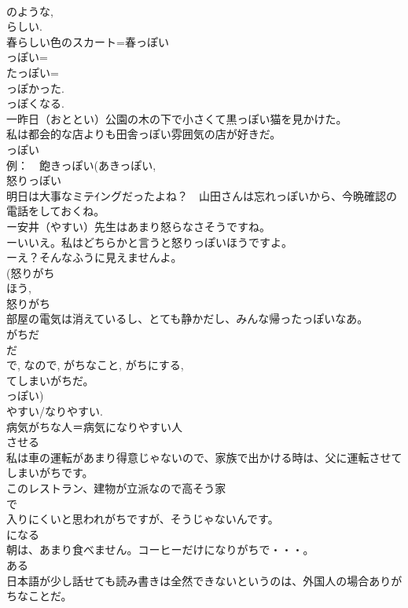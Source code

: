 \documentclass[8pt]{extreport}
\begin{document}
\begin{CJK}{UTF8}{min}
\\	のような, 
\\	らしい. 
\\	春らしい色のスカート=春っぽい
\\	っぽい= 
\\	たっぽい= 
\\	っぽかった.
\\	っぽくなる. 
\\	一昨日（おととい）公園の木の下で小さくて黒っぽい猫を見かけた。
\\	私は都会的な店よりも田舎っぽい雰囲気の店が好きだ。
\\	っぽい
\\	例：　飽きっぽい(あきっぽい, 
\\	怒りっぽい 
\\	明日は大事なミテｲングだったよね？　山田さんは忘れっぽいから、今晩確認の電話をしておくね。
\\	ー安井（やすい）先生はあまり怒らなさそうですね。
\\	ーいいえ。私はどちらかと言うと怒りっぽいほうですよ。
\\	ーえ？そんなふうに見えませんよ。
\\	(怒りがち 
\\	ほう, 
\\	怒りがち 
\\	部屋の電気は消えているし、とても静かだし、みんな帰ったっぽいなあ。
\\	がちだ
\\	だ 
\\	で, なので, がちなこと, がちにする, 
\\	てしまいがちだ。
\\	っぽい)
\\	やすい/なりやすい. 
\\	病気がちな人＝病気になりやすい人
\\	させる 
\\	私は車の運転があまり得意じゃないので、家族で出かける時は、父に運転させてしまいがちです。
\\	このレストラン、建物が立派なので高そう家
\\	で
\\	入りにくいと思われがちですが、そうじゃないんです。
\\	になる 
\\	朝は、あまり食べません。コーヒーだけになりがちで・・・。
\\	ある 
\\	日本語が少し話せても読み書きは全然できないというのは、外国人の場合ありがちなことだ。

\end{CJK}
\end{document}
